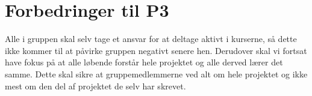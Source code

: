 \section{Forbedringer til P3}
Alle i gruppen skal selv tage et ansvar for at deltage aktivt i kurserne, så dette ikke kommer til at påvirke gruppen negativt senere hen. Derudover skal vi fortsat have fokus på at alle løbende forstår hele projektet og alle derved lærer det samme. Dette skal sikre at gruppemedlemmerne ved alt om hele projektet og ikke mest om den del af projektet de selv har skrevet. 